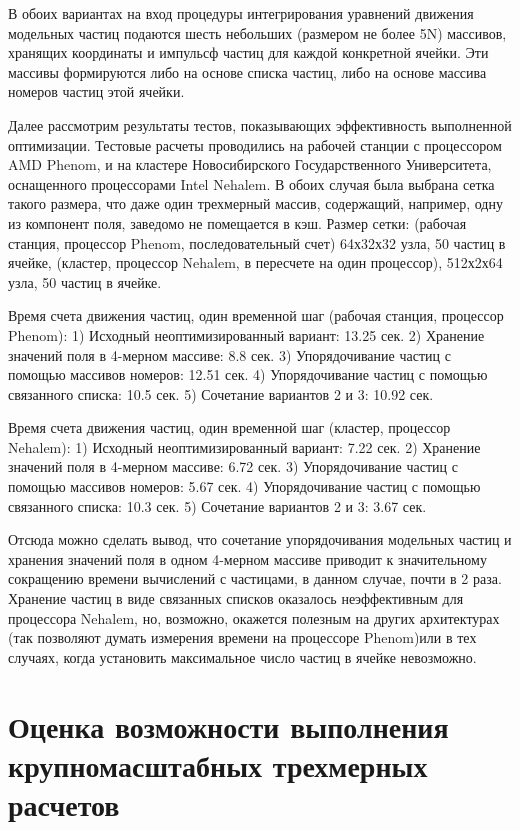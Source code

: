В обоих вариантах на вход процедуры интегрирования уравнений движения модельных частиц подаются шесть небольших (размером не более 5N) массивов, хранящих координаты и импульсф частиц для каждой конкретной ячейки. Эти массивы формируются либо на основе списка частиц, либо на основе массива номеров частиц этой ячейки. 

Далее рассмотрим результаты тестов, показывающих эффективность выполненной оптимизации. Тестовые расчеты проводились на рабочей станции с процессором AMD Phenom, и на кластере Новосибирского Государственного Университета, оснащенного процессорами Intel Nehalem. В обоих случая была выбрана сетка такого размера, что даже один трехмерный массив, содержащий, например, одну из компонент поля, заведомо не помещается в кэш. 
Размер сетки: (рабочая станция, процессор Phenom, последовательный счет) 64х32х32 узла, 50 частиц в ячейке, (кластер, процессор Nehalem, в пересчете на один процессор), 512х2х64 узла, 50 частиц в ячейке. 

Время счета движения частиц, один временной шаг (рабочая станция, процессор Phenom): 
1) Исходный неоптимизированный вариант: 13.25 сек. 
2) Хранение значений поля в 4-мерном массиве: 8.8 сек. 
3) Упорядочивание частиц с помощью массивов номеров: 12.51 сек. 
4) Упорядочивание частиц с помощью связанного списка: 10.5 сек. 
5) Сочетание вариантов 2 и 3: 10.92 сек. 

Время счета движения частиц, один временной шаг (кластер, процессор Nehalem): 
1) Исходный неоптимизированный вариант: 7.22 сек. 
2) Хранение значений поля в 4-мерном массиве: 6.72 сек. 
3) Упорядочивание частиц с помощью массивов номеров: 5.67 сек. 
4) Упорядочивание частиц с помощью связанного списка: 10.3 сек. 
5) Сочетание вариантов 2 и 3: 3.67 сек. 

Отсюда можно сделать вывод, что сочетание упорядочивания модельных частиц и хранения значений поля в одном 4-мерном массиве приводит к значительному сокращению времени вычислений с частицами, в данном случае, почти в 2 раза. Хранение частиц в виде связанных списков оказалось неэффективным для процессора Nehalem, но, возможно, окажется полезным на других архитектурах (так позволяют думать измерения времени на процессоре Phenom)или в тех случаях, когда установить максимальное число частиц в ячейке 
невозможно. 

\section{Оценка возможности выполнения крупномасштабных трехмерных расчетов}

